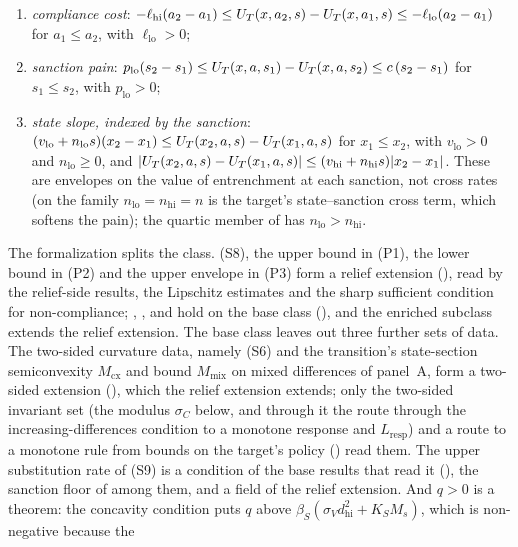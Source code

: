 \begin{enumerate}[label=(P\arabic*)]
\item \emph{compliance cost}:
$-\ell_{\mathrm{hi}}(a_2-a_1)\le U_T(x,a_2,s)-U_T(x,a_1,s)\le-\ell_{\mathrm{lo}}(a_2-a_1)$
for $a_1\le a_2$, with $\ell_{\mathrm{lo}}>0$;
\item \emph{sanction pain}:
$p_{\mathrm{lo}}(s_2-s_1)\le U_T(x,a,s_1)-U_T(x,a,s_2)\le c\,(s_2-s_1)$ for
$s_1\le s_2$, with $p_{\mathrm{lo}}>0$;
\item \emph{state slope, indexed by the sanction}:
$(v_{\mathrm{lo}}+n_{\mathrm{lo}}s)(x_2-x_1)\le U_T(x_2,a,s)-U_T(x_1,a,s)$ for
$x_1\le x_2$, with $v_{\mathrm{lo}}>0$ and $n_{\mathrm{lo}}\ge0$, and
$|U_T(x_2,a,s)-U_T(x_1,a,s)|\le(v_{\mathrm{hi}}+n_{\mathrm{hi}}s)|x_2-x_1|$. These
are envelopes on the value of entrenchment at each sanction, not cross rates
(on the family $n_{\mathrm{lo}}=n_{\mathrm{hi}}=n$ is the target's state--sanction
cross term, which softens the pain); the quartic member of  has
$n_{\mathrm{lo}}>n_{\mathrm{hi}}$.
\end{enumerate}
The formalization splits the class. (S8), the upper bound in (P1), the lower
bound in (P2) and the upper envelope in (P3) form a relief extension
(), read by the relief-side results, the
Lipschitz estimates and the sharp sufficient condition for non-compliance; ,
,  and
 hold on the base class
(), and the enriched subclass extends the relief extension.
The base class leaves out three further sets of data. The two-sided
curvature data, namely (S6) and the transition's state-section semiconvexity
$M_{\mathrm{cx}}$ and bound $M_{\mathrm{mix}}$ on mixed differences of panel~A, form a
two-sided extension (), which the relief extension
extends; only the two-sided invariant set (the modulus $\sigma_C$ below, and through it
the route through the increasing-differences condition to a monotone response
and $L_{\mathrm{resp}}$) and a
route to a monotone rule from bounds on the target's policy
() read them. The upper
substitution rate of (S9) is a condition of the base results that read it
(), the sanction floor of
 among them, and a field of the relief
extension. And $q>0$ is a
theorem: the concavity condition puts $q$ above
$\beta_S(\sigma_Vd_{\mathrm{hi}}^2+K_SM_s)$, which is non-negative because the
